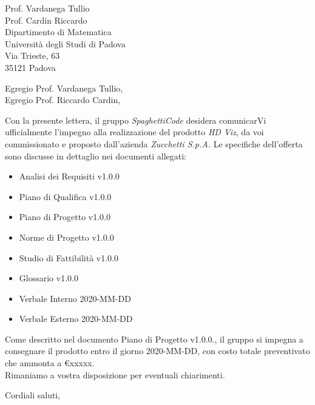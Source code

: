 \documentclass[a4paper,12pt]{letteracdp}
\date{11 gennaio 2021}
\begin{document}
\begin{letter}{
		Prof. Vardanega Tullio \\
		Prof. Cardin Riccardo \\
		Dipartimento di Matematica \\
		Università degli Studi di Padova \\
		Via Trieste, 63 \\
		35121 Padova}
	
	\opening{Egregio Prof. Vardanega Tullio, \\ \noindent Egregio Prof. Riccardo Cardin,}
	
	\begin{flushleft}
	Con la presente lettera, il gruppo \textit{SpaghettiCode} desidera comunicarVi ufficialmente l'impegno alla realizzazione del prodotto \textit{HD Viz}, da voi commissionato e proposto dall'azienda \textit{Zucchetti S.p.A.}
	Le specifiche dell'offerta sono discusse in dettaglio nei documenti allegati:
	\end{flushleft}

	\begin{itemize}
		\item Analisi dei Requisiti v1.0.0
		\item Piano di Qualifica v1.0.0
		\item Piano di Progetto v1.0.0
		\item Norme di Progetto v1.0.0
		\item Studio di Fattibilità v1.0.0
		\item Glossario v1.0.0
		\item Verbale Interno 2020-MM-DD
		\item Verbale Esterno 2020-MM-DD
	\end{itemize}

	\begin{flushleft}
	\noindent Come descritto nel documento Piano di Progetto v1.0.0., il gruppo si impegna a consegnare il prodotto entro il giorno 2020-MM-DD, con costo totale preventivato che ammonta a \euro{xxxxx}.
	\\
	
	Rimaniamo a vostra disposizione per eventuali chiarimenti.
	\end{flushleft}

	\closing{Cordiali saluti,}
	
\end{letter}	
\end{document}
